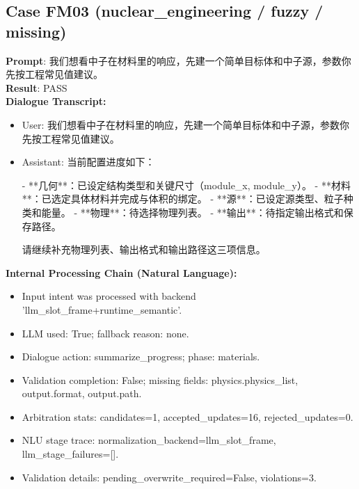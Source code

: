 \documentclass[11pt]{ctexart}
\begin{document}
\subsection{Case FM03 (nuclear\_engineering / fuzzy / missing)}
\textbf{Prompt}: 我们想看中子在材料里的响应，先建一个简单目标体和中子源，参数你先按工程常见值建议。\\
\textbf{Result}: PASS\\
\textbf{Dialogue Transcript:}
\begin{itemize}
\item User: 我们想看中子在材料里的响应，先建一个简单目标体和中子源，参数你先按工程常见值建议。
\item Assistant: 当前配置进度如下：

- **几何**：已设定结构类型和关键尺寸（module\_x, module\_y）。
- **材料**：已选定具体材料并完成与体积的绑定。
- **源**：已设定源类型、粒子种类和能量。
- **物理**：待选择物理列表。
- **输出**：待指定输出格式和保存路径。

请继续补充物理列表、输出格式和输出路径这三项信息。
\end{itemize}
\textbf{Internal Processing Chain (Natural Language):}
\begin{itemize}
\item Input intent was processed with backend 'llm\_slot\_frame+runtime\_semantic'.
\item LLM used: True; fallback reason: none.
\item Dialogue action: summarize\_progress; phase: materials.
\item Validation completion: False; missing fields: physics.physics\_list, output.format, output.path.
\item Arbitration stats: candidates=1, accepted\_updates=16, rejected\_updates=0.
\item NLU stage trace: normalization\_backend=llm\_slot\_frame, llm\_stage\_failures=[].
\item Validation details: pending\_overwrite\_required=False, violations=3.
\end{itemize}
\end{document}
